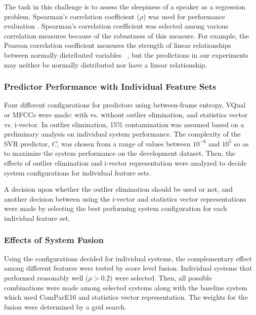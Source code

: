 The task in this challenge is to assess the sleepiness of a speaker as a regression problem. Spearman's correlation coefficient ($\rho$) was used for performance evaluation \cite{schullerinterspeech}. 
Spearman's correlation coefficient was selected among various correlation measures because of the robustness of this measure. For example, the Pearson correlation coefficient measures the strength of linear relationships between normally distributed variables ~\cite{hauke2011comparison}, but the predictions in our experiments may neither be normally distributed nor have a linear relationship. 

\subsubsection{Predictor Performance with Individual Feature Sets}

Four different configurations for predictors using between-frame entropy, VQual or MFCCs were made: with vs. without outlier elimination, and statistics vector vs. i-vector.
In outlier elimination, 15\% contamination was assumed based on a preliminary analysis on individual system performance. The complexity of the SVR predictor, $C$, was chosen from a range of values between $10^{-6}$ and $10^{5}$ so as to maximize the system performance on the development dataset. Then, the effects of outlier elimination and i-vector representation were analyzed to decide system configurations for individual feature sets. 



A decision upon whether the outlier elimination should be used or not, 
and another decision between using the i-vector and statistics vector representations were made by selecting the best performing system configuration for each individual feature set.


\subsubsection{Effects of System Fusion}

Using the configurations decided for individual systems, 
the complementary effect among different features were tested by score level fusion.
Individual systems that performed reasonably well ($\rho>0.2$) were selected.
Then, all possible combinations were made among selected systems along with the baseline system which used ComParE16 and statistics vector representation.
The weights for the fusion were determined by a grid search. 


